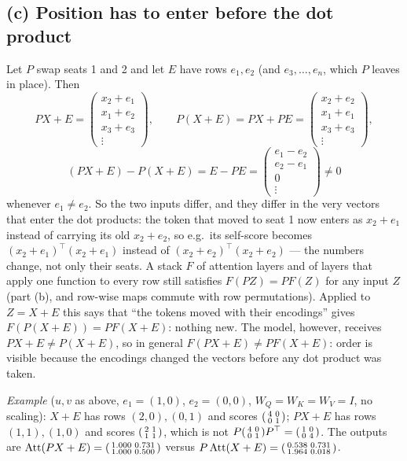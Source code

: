 \subsection*{(c) Position has to enter before the dot product}
Let $P$ swap seats 1 and 2 and let $E$ have rows $e_1,e_2$ (and $e_3,\dots,e_n$, which $P$ leaves in place). Then
\[
PX+E=\begin{pmatrix}x_2+e_1\\x_1+e_2\\x_3+e_3\\\vdots\end{pmatrix},\qquad
P(X+E)=PX+PE=\begin{pmatrix}x_2+e_2\\x_1+e_1\\x_3+e_3\\\vdots\end{pmatrix},
\]
\[
(PX+E)-P(X+E)=E-PE=\begin{pmatrix}e_1-e_2\\e_2-e_1\\0\\\vdots\end{pmatrix}\neq0
\]
whenever $e_1\neq e_2$. So the two inputs differ, and they differ in the very vectors that enter the dot products: the token
that moved to seat 1 now enters as $x_2+e_1$ instead of carrying its old $x_2+e_2$, so e.g.\ its self-score becomes
$(x_2+e_1)^\top(x_2+e_1)$ instead of $(x_2+e_2)^\top(x_2+e_2)$ --- the numbers change, not only their seats.
A stack $F$ of attention layers and of layers that apply one function to every row still satisfies $F(PZ)=PF(Z)$ for any
input $Z$ (part (b), and row-wise maps commute with row permutations). Applied to $Z=X+E$ this says that ``the tokens moved
with their encodings'' gives $F(P(X+E))=PF(X+E)$: nothing new. The model, however, receives $PX+E\neq P(X+E)$, so in general
$F(PX+E)\neq PF(X+E)$: order is visible because the encodings changed the vectors before any dot product was taken.

\emph{Example} ($u,v$ as above, $e_1=(1,0)$, $e_2=(0,0)$, $W_Q=W_K=W_V=I$, no scaling):
$X+E$ has rows $(2,0),(0,1)$ and scores $\begin{psmallmatrix}4&0\\0&1\end{psmallmatrix}$; $PX+E$ has rows $(1,1),(1,0)$ and scores
$\begin{psmallmatrix}2&1\\1&1\end{psmallmatrix}$, which is not $P\begin{psmallmatrix}4&0\\0&1\end{psmallmatrix}P^\top=\begin{psmallmatrix}1&0\\0&4\end{psmallmatrix}$.
The outputs are $\mathrm{Att}(PX+E)=\begin{psmallmatrix}1.000&0.731\\1.000&0.500\end{psmallmatrix}$ versus
$P\,\mathrm{Att}(X+E)=\begin{psmallmatrix}0.538&0.731\\1.964&0.018\end{psmallmatrix}$.
